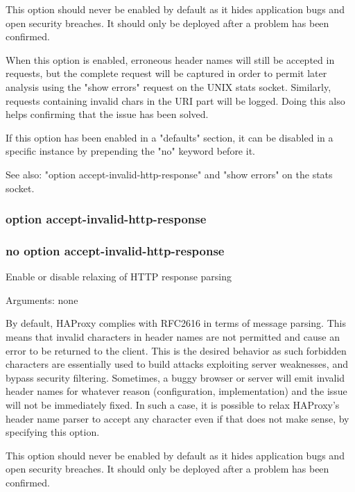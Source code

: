   This option should never be enabled by default as it hides application bugs
  and open security breaches. It should only be deployed after a problem has
  been confirmed.

  When this option is enabled, erroneous header names will still be accepted in
  requests, but the complete request will be captured in order to permit later
  analysis using the "show errors" request on the UNIX stats socket. Similarly,
  requests containing invalid chars in the URI part will be logged. Doing this
  also helps confirming that the issue has been solved.

  If this option has been enabled in a "defaults" section, it can be disabled
  in a specific instance by prepending the "no" keyword before it.

  See also: "option accept-invalid-http-response" and "show errors" on the
             stats socket.

\subsubsection{option accept-invalid-http-response}
\subsubsection{no option accept-invalid-http-response}

  
  Enable or disable relaxing of HTTP response parsing


  Arguments: none

  By default, HAProxy complies with RFC2616 in terms of message parsing. This
  means that invalid characters in header names are not permitted and cause an
  error to be returned to the client. This is the desired behavior as such
  forbidden characters are essentially used to build attacks exploiting server
  weaknesses, and bypass security filtering. Sometimes, a buggy browser or
  server will emit invalid header names for whatever reason (configuration,
  implementation) and the issue will not be immediately fixed. In such a case,
  it is possible to relax HAProxy's header name parser to accept any character
  even if that does not make sense, by specifying this option.

  This option should never be enabled by default as it hides application bugs
  and open security breaches. It should only be deployed after a problem has
  been confirmed.

